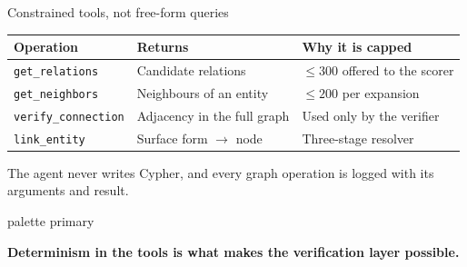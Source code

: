 \documentclass[aspectratio=169,12pt]{beamer}
\newcommand{\takeaway}[1]{%
  \vspace{1.5mm}%
  \begin{beamercolorbox}[wd=\dimexpr\textwidth-4.4mm\relax,sep=2.2mm,
    rounded=true]{palette primary}%
    \color{agrdark}\small\raggedright\textbf{#1}%
  \end{beamercolorbox}}
\begin{document}
\begin{frame}{Constrained tools, not free-form queries}
  \begin{table}
    \small
    \begin{tabular}{@{}L{37mm}L{33mm}L{38mm}@{}}
      \toprule
      \textbf{Operation} & \textbf{Returns} & \textbf{Why it is capped} \\
      \midrule
      \texttt{get\_relations}  & Candidate relations
                               & $\leq 300$ offered to the scorer \\
      \texttt{get\_neighbors}  & Neighbours of an entity
                               & $\leq 200$ per expansion \\
      \texttt{verify\_connection} & Adjacency in the full graph
                               & Used only by the verifier \\
      \texttt{link\_entity}    & Surface form $\rightarrow$ node
                               & Three-stage resolver \\
      \bottomrule
    \end{tabular}
  \end{table}
  {\small The agent never writes Cypher, and every graph operation is logged
  with its arguments and result.}
  \takeaway{Determinism in the tools is what makes the verification layer
    possible.}
\end{frame}
\end{document}
